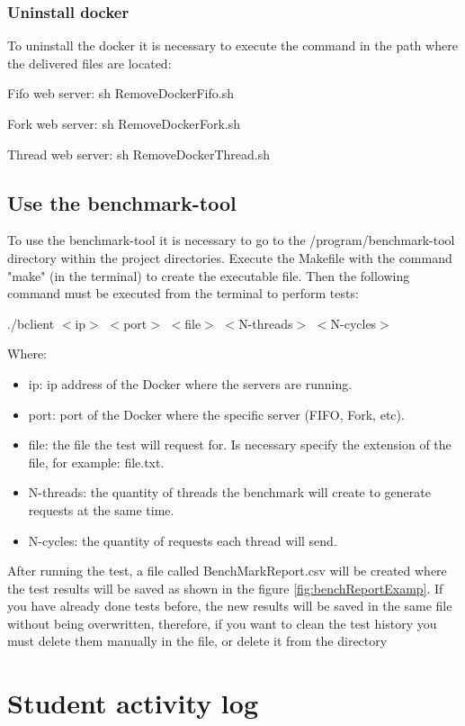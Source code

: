 \documentclass{article}
\begin{document}
\subsubsection{Uninstall docker}
To uninstall the docker it is necessary to execute the command in the path where the delivered files are located:\\
\newline
\centerline{Fifo web server: sh RemoveDockerFifo.sh}
\centerline{Fork web server: sh RemoveDockerFork.sh}
\centerline{Thread web server: sh RemoveDockerThread.sh} 

\subsection{Use the benchmark-tool}
To use the benchmark-tool it is necessary to go to the /program/benchmark-tool directory within the project directories. Execute the Makefile with the command "make" (in the terminal) to create the executable file. Then the following command must be executed from the terminal to perform tests:\\
\centerline{./bclient $<$ip$>$ $<$port$>$ $<$file$>$ $<$N-threads$>$ $<$N-cycles$>$
}
Where:
\begin{itemize}
    \item ip: ip address of the Docker where the servers are running.
    \item port: port of the Docker where the specific server (FIFO, Fork, etc).
    \item file: the file the test will request for. Is necessary specify the extension of the file, for example: file.txt.
    \item N-threads: the quantity of threads the benchmark will create to generate requests at the same time.
    \item N-cycles: the quantity of requests each thread will send.
\end{itemize}
After running the test, a file called BenchMarkReport.csv will be created where the test results will be saved as shown in the figure \ref{fig:benchReportExamp}. If you have already done tests before, the new results will be saved in the same file without being overwritten, therefore, if you want to clean the test history you must delete them manually in the file, or delete it from the directory

\section{Student activity log}
\end{document}
